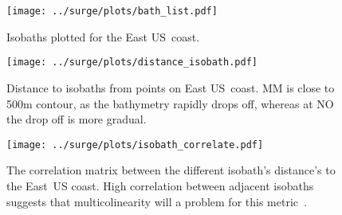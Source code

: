 
\begin{figure}[htb!]
\texttt{[image: ../surge/plots/bath\_list.pdf]}
\vspace{-25pt}

\caption{Isobaths plotted for the East US~coast.}
\label{fig:bath}
\texttt{[image: ../surge/plots/distance\_isobath.pdf]}
\vspace{-25pt}

\caption{Distance to isobaths from points on East US~coast. MM is close to 500m
contour, as the bathymetry rapidly drops off, whereas at NO the drop off is more
gradual.}
\label{fig:isobath}
\texttt{[image: ../surge/plots/isobath\_correlate.pdf]}
\vspace{-25pt}

\caption{The correlation matrix between the different isobath's distance's to
the East~US coast. High correlation between adjacent isobaths
suggests that multicolinearity will a problem for this metric~\cite{faul2019concise}.}
\label{fig:isobath}
\end{figure}
